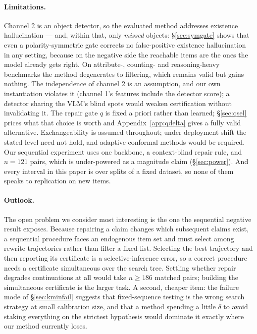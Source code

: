 \documentclass[review,number,doubleblind]{elsarticle}
\theoremstyle{plain}
\theoremstyle{definition}
\theoremstyle{remark}
\begin{document}
\paragraph{Limitations.}
Channel 2 is an object detector, so the evaluated method addresses existence hallucination ---
and, within that, only \emph{missed} objects: \S\ref{sec:symgate} shows that even a
polarity-symmetric gate corrects no false-positive existence hallucination in any setting,
because on the negative side the reachable items are the ones the model already gets right. On
attribute-, counting- and reasoning-heavy benchmarks the method degenerates to filtering, which
remains valid but gains nothing. The independence of channel 2 is an assumption, and our own
instantiation violates it (channel 1's features include the detector score); a detector sharing
the VLM's blind spots would weaken certification without invalidating it. The repair gate $q$ is
fixed a priori rather than learned; \S\ref{sec:qsel} prices what that choice is worth and
Appendix~\ref{app:qdelta} gives a fully valid alternative. Exchangeability is assumed throughout;
under deployment shift the stated level need not hold, and adaptive conformal methods
\citep{gibbs2021} would be required. Our sequential experiment uses one backbone, a context-blind
repair rule, and $n=121$ pairs, which is under-powered as a magnitude claim
(\S\ref{sec:power}). And every interval in this paper is over splits of a fixed dataset, so none
of them speaks to replication on new items.

\paragraph{Outlook.}
The open problem we consider most interesting is the one the sequential negative result exposes.
Because repairing a claim changes which subsequent claims exist, a sequential procedure faces an
endogenous item set and must select among rewrite trajectories rather than filter a fixed list.
Selecting the best trajectory and then reporting its certificate is a selective-inference error,
so a correct procedure needs a certificate simultaneous over the search tree. Settling whether
repair degrades continuations at all would take $n\ge186$ matched pairs; building the
simultaneous certificate is the larger task. A second, cheaper item: the failure mode of
\S\ref{sec:kminfail} suggests that fixed-sequence testing is the wrong search strategy at small
calibration size, and that a method spending a little $\delta$ to avoid staking everything on the
strictest hypothesis would dominate it exactly where our method currently loses.
\end{document}
